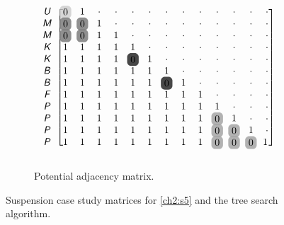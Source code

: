 \begin{figure}
\begin{subfigure}[b]{\columnwidth}
\begin{align*}
{\begin{blockarray}{cccccccccccccc}
\begin{block}{c[ccccccccccccc]}
\xcolor{U} & \hlight{0}{20} & 1 & \cdot & \cdot & \cdot & \cdot & \cdot & \cdot & \cdot & \cdot & \cdot & \cdot & \cdot \\
\xcolor{M} &	\hlight{0}{55} & \hlight{0}{55} & 1 & \cdot & \cdot & \cdot & \cdot & \cdot & \cdot & \cdot & \cdot & \cdot & \cdot \\
\xcolor{M} &	\hlight{0}{55} & \hlight{0}{55} & 1 & 1 & \cdot & \cdot & \cdot & \cdot & \cdot & \cdot & \cdot & \cdot & \cdot \\
\xcolor{K} &	1 & 1 & 1 & 1 & 1 & \cdot & \cdot & \cdot & \cdot & \cdot & \cdot & \cdot & \cdot \\
\xcolor{K} &	1 & 1 & 1 & 1 & \hlight{0}{90} & 1 & \cdot & \cdot & \cdot & \cdot & \cdot & \cdot & \cdot \\
\xcolor{B} &	1 & 1 & 1 & 1 & 1 & 1 &	1 & \cdot & \cdot & \cdot & \cdot & \cdot & \cdot \\
\xcolor{B} &	1 & 1 & 1 & 1 & 1 & 1 &	\hlight{0}{90} & 1 & \cdot & \cdot & \cdot & \cdot & \cdot \\
\xcolor{F} &	1 & 1 & 1 & 1 & 1 & 1 &	1 & 1 & 1 & \cdot & \cdot & \cdot & \cdot \\
\xcolor{P} &	1 & 1 & 1 & 1 & 1 & 1 &	1 & 1 & 1 & 1 & \cdot & \cdot & \cdot \\
\xcolor{P} &	1 & 1 & 1 & 1 & 1 & 1 &	1 & 1 & 1 & \hlight{0}{37.5} & 1 & \cdot & \cdot \\
\xcolor{P} &	1 & 1 & 1 & 1 & 1 & 1 & 1 &	1 & 1 & \hlight{0}{37.5} & \hlight{0}{37.5} & 1 & \cdot \\
\xcolor{P} &	1 & 1 & 1 & 1 & 1 & 1 & 1 & 1 &	1 & \hlight{0}{37.5} & \hlight{0}{37.5} & \hlight{0}{37.5} & \tikzmark{bottom}{1}\ \\
\end{block}
\end{blockarray}
}
\end{align*}
\caption{Potential adjacency matrix.\label{fig:ch2:suspension2_2}}
\end{subfigure}
\caption{Suspension case study matrices for \ref{ch2:s5} and the tree search algorithm.\label{fig:ch2:suspension2}}
\end{figure}
\tikzexternalenable